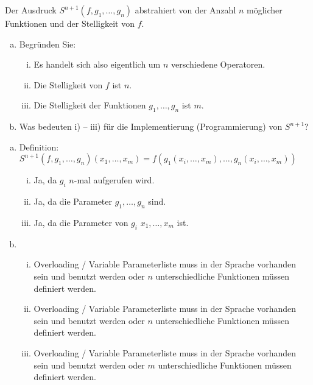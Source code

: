 \begin{card}
  Der Ausdruck $S^{n+1}(f, g_1, \ldots, g_n)$ abstrahiert von der Anzahl $n$ möglicher Funktionen und der Stelligkeit von $f$.
  \begin{enumerate}[a)]
    \item Begründen Sie:
    \begin{enumerate}[i)]
      \item Es handelt sich also eigentlich um $n$ verschiedene Operatoren.
      \item Die Stelligkeit von $f$ ist $n$.
      \item Die Stelligkeit der Funktionen $g_1, \ldots, g_n$ ist $m$.
    \end{enumerate}
    \item Was bedeuten i) – iii) für die Implementierung (Programmierung) von $S^{n+1}$?
  \end{enumerate}
  \hr
  \begin{enumerate}[a)]
    \item Definition: $S^{n+1}(f, g_1, \ldots, g_n)(x_1, \ldots, x_m) = f(g_1(x_i, \ldots, x_m), \ldots, g_n(x_i, \ldots, x_m))$
    \begin{enumerate}[i)]
      \item Ja, da $g_i$ $n$-mal aufgerufen wird.
      \item Ja, da die Parameter $g_1, \ldots, g_n$ sind.
      \item Ja, da die Parameter von $g_i$ $x_1, \ldots, x_m$ ist.
    \end{enumerate}
    \item
    \begin{enumerate}[i)]
      \item Overloading / Variable Parameterliste muss in der Sprache vorhanden sein und benutzt werden oder $n$ unterschiedliche Funktionen müssen definiert werden.
      \item Overloading / Variable Parameterliste muss in der Sprache vorhanden sein und benutzt werden oder $n$ unterschiedliche Funktionen müssen definiert werden.
      \item Overloading / Variable Parameterliste muss in der Sprache vorhanden sein und benutzt werden oder $m$ unterschiedliche Funktionen müssen definiert werden.
    \end{enumerate}
  \end{enumerate}
\end{card}

